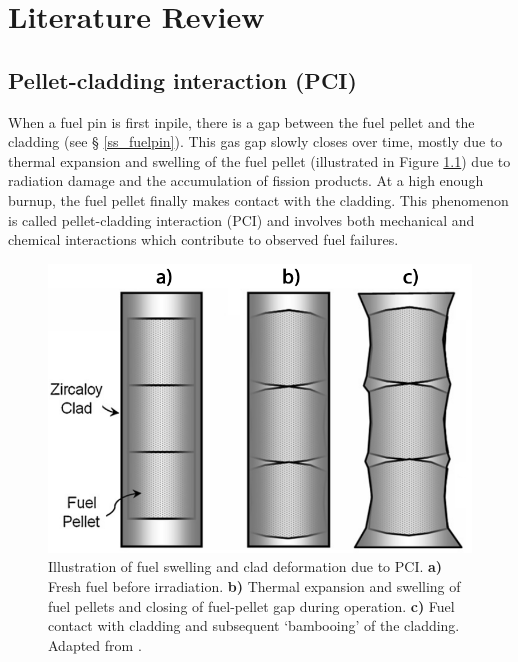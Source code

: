 \chapter{Literature Review}

\label{literature_review}

\section{Pellet-cladding interaction (PCI)}

When a fuel pin is first inpile, there is a gap between the fuel pellet and the cladding (see § \ref{ss_fuelpin}). This gas gap slowly closes over time, mostly due to thermal expansion and swelling of the fuel pellet (illustrated in Figure \ref{figure:pcmi}) due to radiation damage and the accumulation of fission products. At a high enough burnup, the fuel pellet finally makes contact with the cladding. This phenomenon is called pellet-cladding interaction (PCI) and involves both mechanical and chemical interactions which contribute to observed fuel failures.

\begin{figure}[ht] %
\centering
\includegraphics[width=13cm]{images/pcmi.png}
\caption[Illustration of fuel swelling and clad deformation due to PCI. \textbf{a)} Fresh fuel before irradiation. \textbf{b)} Thermal expansion and swelling of fuel pellets and closing of fuel-pellet gap during operation. \textbf{c)} Fuel contact with cladding and subsequent `bambooing' of the cladding.]{Illustration of fuel swelling and clad deformation due to PCI. \textbf{a)} Fresh fuel before irradiation. \textbf{b)} Thermal expansion and swelling of fuel pellets and closing of fuel-pellet gap during operation. \textbf{c)} Fuel contact with cladding and subsequent `bambooing' of the cladding. Adapted from \cite{alam2011review}.}
\label{figure:pcmi}
\end{figure}

